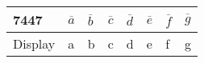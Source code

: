 \begin{tabular}{|p{3cm}|p{1cm}|p{1cm}|p{1cm}|p{1cm}|p{1cm}|p{1cm}|p{1cm}|}                            
\hline                                         
7447& $\overline{a}$ & $\overline{b}$ & $\overline{c}$ & $\overline{d}$ & $\overline{e}$ & $\overline{f}$ & $\overline{g}$\\          
\hline                                          
Display& a& b& c& d& e& f& g\\         
\hline                                        
\end{tabular}
